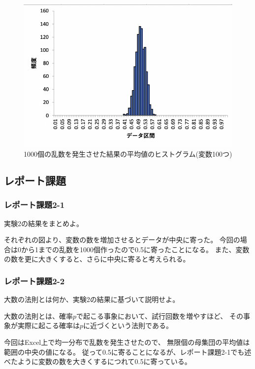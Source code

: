 \documentclass[12pt]{jarticle}
\begin{document}
\begin{figure}[h]
    \begin{center}
        \includegraphics[scale=0.8]{kadai4_2graph5.png}
    \end{center}
    \caption{1000個の乱数を発生させた結果の平均値のヒストグラム(変数100つ)}
\end{figure}

\clearpage

\subsection{レポート課題}
\subsubsection*{レポート課題2-1}
\begin{shadebox}
    実験2の結果をまとめよ。
\end{shadebox}
それぞれの図より、変数の数を増加させるとデータが中央に寄った。
今回の場合は0から1までの乱数を1000個作ったので0.5に寄ったことになる。
また、変数の数を更に大きくすると、さらに中央に寄ると考えられる。

\subsubsection*{レポート課題2-2}
\begin{shadebox}
    大数の法則とは何か、実験2の結果に基づいて説明せよ。
\end{shadebox}
大数の法則とは、確率$p$で起こる事象において、試行回数を増やすほど、
その事象が実際に起こる確率は$p$に近づくという法則である。

今回はExcel上で均一分布で乱数を発生させたので、
無限個の母集団の平均値は範囲の中央の値になる。
従って0.5に寄ることになるが、レポート課題2-1でも述べたように変数の数を大きくするにつれて0.5に寄っている。
\end{document}
